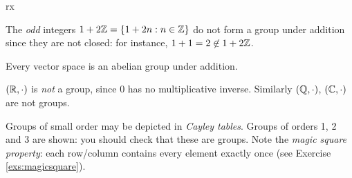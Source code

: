 \begin{examples}{}{rx}
\begin{enumerate}
  \item The \emph{odd} integers $1+2\mathbb{Z}=\{1+2n:n\in\mathbb{Z}\}$ do not form a group under addition since they are not closed: for instance, $1+1=2\not\in 1+2\mathbb{Z}$.
  
  \item Every vector space is an abelian group under addition. %
	
	\item $(\mathbb{R},\cdot)$ is \emph{not} a group, since $0$ has no multiplicative inverse. Similarly $(\mathbb{Q},\cdot)$, $(\mathbb{C},\cdot)$ are not groups.
	

	\begin{minipage}[t]{0.6\linewidth}\vspace{-9pt}
	\item\label{ex:smallcayley1} Groups of small order may be depicted in \emph{Cayley tables\footnotemark}.\smallbreak
	Groups of orders 1, 2 and 3 are shown: you should check that these are groups.\smallbreak
	Note the \emph{magic square property}: each row/column contains every element exactly once (see Exercise \ref{exs:magicsquare}).
	\end{minipage}\begin{minipage}[t]{0.4\linewidth}\vspace{-8pt}
	\flushright{}
	\end{minipage}	
	\end{enumerate}
	\end{examples}


